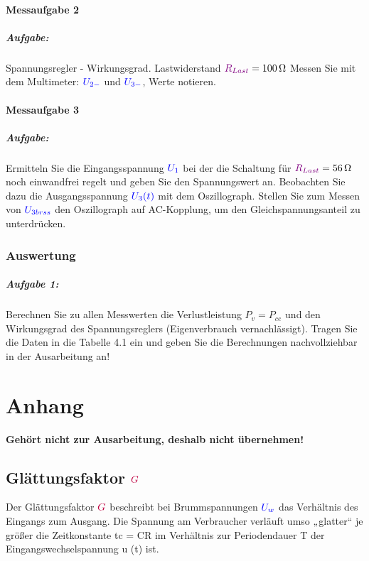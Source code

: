 \documentclass[11pt,a4paper,titlepage,parskip=half]{scrreprt}
\begin{document}
            \subsubsection{Messaufgabe 2}
            \paragraph{Aufgabe:} Spannungsregler - Wirkungsgrad. Lastwiderstand $\textcolor{violet}{R_{Last}} = \SI{100}{\ohm}$ Messen Sie mit dem  Multimeter: $\textcolor{blue}{U_{2-}}$ und $\textcolor{blue}{U_{3-}}$, Werte notieren.
            
            \subsubsection{Messaufgabe 3}
            \paragraph{Aufgabe:}  Ermitteln Sie die Eingangsspannung $\textcolor{blue}{U_1}$ bei der die Schaltung für $\textcolor{violet}{R_{Last}} = \SI{56}{\ohm}$ noch einwandfrei regelt und geben Sie den Spannungswert an. Beobachten Sie dazu die Ausgangsspannung $\textcolor{blue}{U_3(t)}$ mit dem Oszillograph. Stellen Sie zum Messen von $\textcolor{blue}{U_{3brss}}$ den Oszillograph auf AC-Kopplung, um den Gleichspannungsanteil zu unterdrücken.
            
            \subsection{Auswertung}
        	\paragraph{Aufgabe 1: }  Berechnen Sie zu allen Messwerten die Verlustleistung $P_v = P_{ce}$ und den Wirkungsgrad des Spannungsreglers (Eigenverbrauch vernachlässigt). Tragen Sie die Daten in die Tabelle 4.1 ein und geben Sie die Berechnungen nachvollziehbar in der Ausarbeitung an!
            
           \listoftables
           
           
           \chapter{Anhang}
           \textbf{Gehört nicht zur Ausarbeitung, deshalb nicht übernehmen!}
           
           \section{Glättungsfaktor $\textcolor{purple}{G}$}
           Der Glättungsfaktor  $\textcolor{purple}{G}$ beschreibt bei Brummspannungen $\textcolor{blue}{U_w}$ das Verhältnis des Eingangs zum Ausgang. Die Spannung am Verbraucher verläuft umso „glatter“ je größer die Zeitkonstante tc = CR im Verhältnis zur Periodendauer T der Eingangswechselspannung u (t) ist.
           
\end{document}
